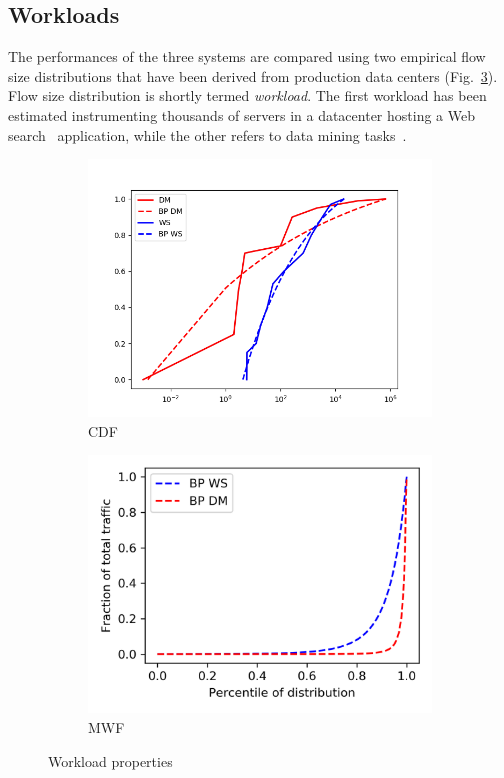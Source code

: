 \subsection{Workloads}
\label{sec:workloads}
The performances of the three systems are compared using two empirical flow size distributions that have been derived from production data centers (Fig.~\ref{fig:workloads}). Flow size distribution is shortly termed \emph{workload}. The first workload has been estimated instrumenting thousands of servers in a datacenter hosting a Web search~\cite{dctcp} application, while the other refers to data mining tasks~\cite{vl2}. 
\begin{figure}
	\centering
	\begin{subfigure}[b]{0.49\textwidth}
		\centering
		\includegraphics[width=\textwidth]{Chapter3/Figures/fits}
		\caption{CDF}
		\label{fig:cdfs}
	\end{subfigure}
   \hfill
   \begin{subfigure}[b]{0.49\textwidth}
   	\centering
   	\includegraphics[width=\textwidth]{Chapter3/Figures/mwf}
   	\caption{MWF}
   	\label{fig:mwf}
   \end{subfigure}
	\caption{Workload properties}
	\label{fig:workloads}
\end{figure}

